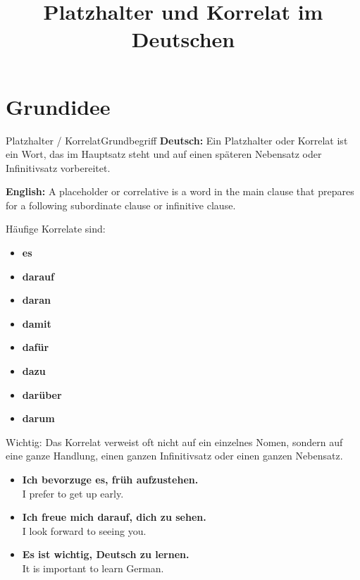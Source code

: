 \documentclass[a4paper,11pt]{article}
\title{Platzhalter und Korrelat im Deutschen}
\date{}
\newcommand{\GermanText}[1]{\textbf{Deutsch: }#1\par}
\newcommand{\EnglishText}[1]{{\small\color{SoftGray}\textbf{English: }#1\par}}
\newcommand{\ExampleItem}[2]{\item \textbf{#1}\\{\small\color{SoftGray}#2}}
\begin{document}
    \maketitle
    \tableofcontents
    \newpage
    
    
    \section{Grundidee}
        
        \begin{grammarentry}{Platzhalter / Korrelat}{Grundbegriff}
            \GermanText{Ein Platzhalter oder Korrelat ist ein Wort, das im Hauptsatz steht und auf einen späteren Nebensatz oder Infinitivsatz vorbereitet.}
            \EnglishText{A placeholder or correlative is a word in the main clause that prepares for a following subordinate clause or infinitive clause.}
            
            Häufige Korrelate sind:
            \begin{itemize}
                \item \textbf{es}
                \item \textbf{darauf}
                \item \textbf{daran}
                \item \textbf{damit}
                \item \textbf{dafür}
                \item \textbf{dazu}
                \item \textbf{darüber}
                \item \textbf{darum}
            \end{itemize}
            
            Wichtig: Das Korrelat verweist oft nicht auf ein einzelnes Nomen, sondern auf eine ganze Handlung, einen ganzen Infinitivsatz oder einen ganzen Nebensatz.
        \end{grammarentry}
        
        \begin{exbox}
            \begin{itemize}
                \ExampleItem{Ich bevorzuge es, früh aufzustehen.}{I prefer to get up early.}
                \ExampleItem{Ich freue mich darauf, dich zu sehen.}{I look forward to seeing you.}
                \ExampleItem{Es ist wichtig, Deutsch zu lernen.}{It is important to learn German.}
            \end{itemize}
        \end{exbox}
    
\end{document}
